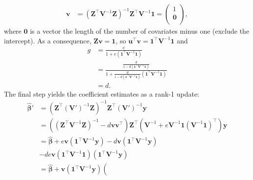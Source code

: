 \documentclass[9pt,twocolumn,twoside]{gsajnl}
\begin{document}
\begin{appendices}
  \begin{align*}
    \mathbf{v}
    &=
      \left( \mathbf{Z}^\intercal \mathbf{V}^{-1} \mathbf{Z} \right)^{-1} \mathbf{Z}^\intercal \mathbf{V}^{-1} \mathbf{1}
      =
      \begin{pmatrix}
        1 \\
        \mathbf{0} \\
      \end{pmatrix}
      ,
  \end{align*}
  where $\mathbf{0}$ is a vector the length of the number of covariates minus one (exclude the intercept).
  As a consequence, $\mathbf{Z} \mathbf{v} = \mathbf{1}$, so $\mathbf{u}^\intercal \mathbf{v} = \mathbf{1}^\intercal \mathbf{V}^{-1} \mathbf{1}$ and
  \begin{align*}
    g
    &=
      \frac{ e } {1 + e (\mathbf{1}^\intercal \mathbf{V}^{-1} \mathbf{1}) }
    \\
    &=
      \frac{
      \frac{ d }{ 1 - d \left( \mathbf{1}^\intercal \mathbf{V}^{-1} \mathbf{1} \right) }
      } {
      1 + \frac{ d }{ 1 - d \left( \mathbf{1}^\intercal \mathbf{V}^{-1} \mathbf{1} \right) } (\mathbf{1}^\intercal \mathbf{V}^{-1} \mathbf{1})
      }
    \\
    &=
      d
      .
  \end{align*}
  The final step yields the coefficient estimates as a rank-1 update:
  \begin{align*}
    \boldsymbol{\hat{\beta}}'
    &=
      \left( \mathbf{Z}^\intercal \left( \mathbf{V}' \right) ^{-1} \mathbf{Z} \right)^{-1} \mathbf{Z}^\intercal \left( \mathbf{V}' \right)^{-1} \mathbf{y}
    \\
    &=
      \left(   \left( \mathbf{Z}^\intercal \mathbf{V}^{-1} \mathbf{Z} \right)^{-1}
      - d \mathbf{v} \mathbf{v}^\intercal
      \right) \mathbf{Z}^\intercal \left( \mathbf{V}^{-1} + e \mathbf{V}^{-1} \mathbf{1} \left( \mathbf{V}^{-1} \mathbf{1} \right)^\intercal \right) \mathbf{y}
    \\
    &=
      \boldsymbol{\hat{\beta}}
      +
      e \mathbf{v} \left( \mathbf{1}^\intercal \mathbf{V}^{-1} \mathbf{y} \right)
      - d \mathbf{v} \left( \mathbf{1}^\intercal \mathbf{V}^{-1} \mathbf{y} \right)
    \\
    & - d e \mathbf{v} \left( \mathbf{1}^\intercal \mathbf{V}^{-1} \mathbf{1} \right) \left( \mathbf{1}^\intercal \mathbf{V}^{-1} \mathbf{y} \right)
    \\
    &=
      \boldsymbol{\hat{\beta}}
      + \mathbf{v} \left( \mathbf{1}^\intercal \mathbf{V}^{-1} \mathbf{y} \right) \left(

\end{align*}
\end{appendices}
\end{document}
